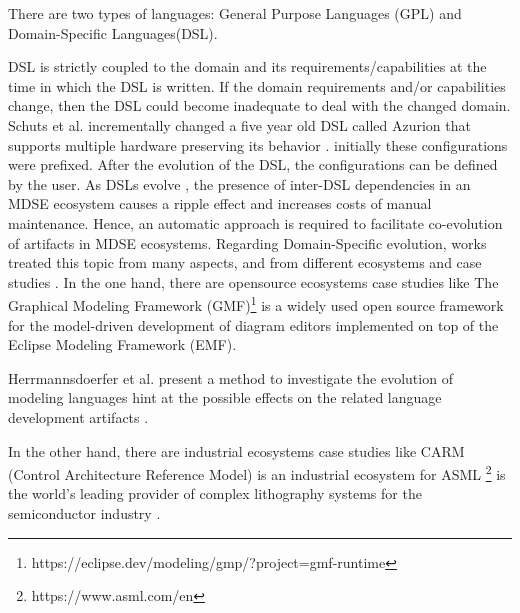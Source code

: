    There are two types of languages: General Purpose Languages (GPL) and Domain-Specific Languages(DSL). 
   
  
  DSL is strictly coupled to the domain and
  its requirements/capabilities at the time in which the DSL is written. If the domain requirements and/or capabilities change, then the DSL could become inadequate to deal with the changed domain. Schuts et al. \cite{schuts2021industrial} incrementally changed a five year old DSL called Azurion that supports multiple hardware preserving its behavior . initially these configurations were prefixed. After the evolution of the DSL, the configurations can be defined by the user. 
 As DSLs evolve \cite{favre2005languages,herrmannsdorfer2013coupled}, the presence of inter-DSL dependencies in an MDSE ecosystem causes a ripple effect and increases costs of manual maintenance. Hence, an automatic approach is required to facilitate co-evolution of artifacts in MDSE ecosystems.
   Regarding Domain-Specific evolution, works treated this topic from many aspects, and from different ecosystems and case studies \cite{mengerink2016dsl}.
 In the one hand, there are opensource ecosystems case studies like The Graphical Modeling Framework (GMF)\footnote{https://eclipse.dev/modeling/gmp/?project=gmf-runtime} is a widely used open source framework for the model-driven development of diagram editors implemented on top of the Eclipse Modeling Framework (EMF).
 
  
Herrmannsdoerfer et al. present a method to investigate the evolution of modeling languages hint at the possible effects on the related language development artifacts  \cite{10.1007/978-3-642-12107-4_3}.
  
    
In the other hand, there are industrial  ecosystems case studies like CARM (Control Architecture Reference Model) is an industrial ecosystem for ASML \footnote{https://www.asml.com/en} is the world’s leading provider of complex lithography systems for the semiconductor industry  \cite{mengerink2016dsl}.

